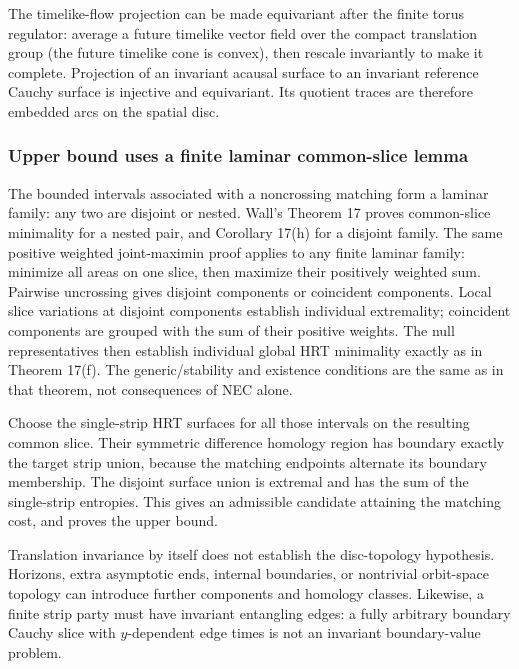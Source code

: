 \documentclass[11pt]{article}
\begin{document}
The timelike-flow projection can be made equivariant after the finite
torus regulator: average a future timelike vector field over the compact
translation group (the future timelike cone is convex), then rescale
invariantly to make it complete. Projection of an invariant acausal
surface to an invariant reference Cauchy surface is injective and
equivariant. Its quotient traces are therefore embedded arcs on the
spatial disc.

\subsubsection{Upper bound uses a finite laminar common-slice
lemma}\label{upper-bound-uses-a-finite-laminar-common-slice-lemma}

The bounded intervals associated with a noncrossing matching form a
laminar family: any two are disjoint or nested. Wall's Theorem 17 proves
common-slice minimality for a nested pair, and Corollary 17(h) for a
disjoint family. The same positive weighted joint-maximin proof applies
to any finite laminar family: minimize all areas on one slice, then
maximize their positively weighted sum. Pairwise uncrossing gives
disjoint components or coincident components. Local slice variations at
disjoint components establish individual extremality; coincident
components are grouped with the sum of their positive weights. The null
representatives then establish individual global HRT minimality exactly
as in Theorem 17(f). The generic/stability and existence conditions are
the same as in that theorem, not consequences of NEC alone.

Choose the single-strip HRT surfaces for all those intervals on the
resulting common slice. Their symmetric difference homology region has
boundary exactly the target strip union, because the matching endpoints
alternate its boundary membership. The disjoint surface union is
extremal and has the sum of the single-strip entropies. This gives an
admissible candidate attaining the matching cost, and proves the upper
bound.

Translation invariance by itself does not establish the disc-topology
hypothesis. Horizons, extra asymptotic ends, internal boundaries, or
nontrivial orbit-space topology can introduce further components and
homology classes. Likewise, a finite strip party must have invariant
entangling edges: a fully arbitrary boundary Cauchy slice with
\(y\)-dependent edge times is not an invariant boundary-value problem.
\end{document}
